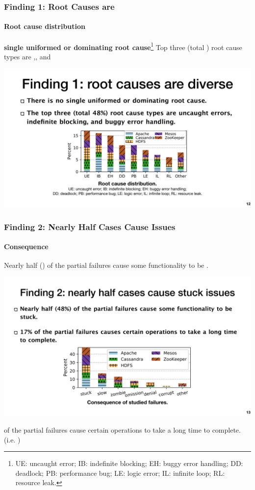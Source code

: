 \documentclass[aspectratio=169]{beamer}
\newcommand{\red}[1]{{\color{red}{#1}}}
\newcommand{\blue}[1]{{\color{blue}{#1}}}
\begin{document}
\begin{frame}
    \frametitle{Finding 1: Root Causes are \red{Diverse}}
    \framesubtitle{Root cause distribution}
    \begin{block}{\textbf{\red{No} single uniformed or dominating root cause}\footnote{UE: uncaught error; IB: indefinite blocking; EH: buggy error handling;
                DD: deadlock; PB: performance bug; LE: logic error; IL: infinite loop; RL: resource leak.}}
        Top three (total \red{48\%}) root cause types are \blue{uncaught errors},\blue{indefinite blocking}, and \blue{buggy error handling}
    \end{block}

    \begin{center}
        \includegraphics[width=.75\textwidth]{fig/root-cause}
    \end{center}
\end{frame}

\begin{frame}
    \frametitle{Finding 2: Nearly Half Cases Cause \red{Stuck} Issues}
    \framesubtitle{Consequence}
    Nearly half (\red{48\%}) of the partial failures cause some functionality to be \textit{\red{stuck}}.
    \begin{center}
        \includegraphics[width=.75\textwidth]{fig/consequence}
    \end{center}

    \red{17\%} of the partial failures cause certain operations to take a long time to complete. (i.e. \blue{\textit{slow}})
\end{frame}
\end{document}
